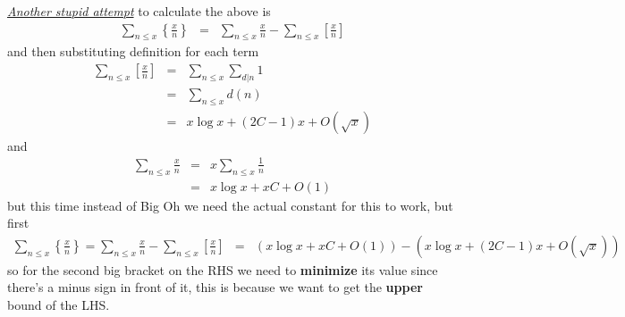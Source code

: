 \documentclass[aps,preprint,preprintnumbers,nofootinbib,showpacs,prd]{revtex4-1}
\newcommand{\nbea}{\begin{eqnarray*}}
\newcommand{\neea}{\end{eqnarray*}}
\begin{document}
\underline{\textit{Another stupid attempt}} to calculate the above is
%
\nbea
\sum_{n\le x}\left\{\frac{x}{n}\right\} & = & \sum_{n\le x}\frac{x}{n} - \sum_{n\le x}\left\lbrack\frac{x}{n}\right\rbrack 
\neea
%
and then substituting definition for each term
%
\nbea
\sum_{n\le x}\left\lbrack\frac{x}{n}\right\rbrack & = & \sum_{n\le x} \sum_{d|n} 1 \\
& = & \sum_{n\le x} d(n) \\
& = & x\log x + (2C-1)x + O(\sqrt{x})
\neea
%
and
%
\nbea
\sum_{n\le x}\frac{x}{n} & = & x\sum_{n\le x}\frac{1}{n} \\
& = & x\log x + xC + O\left(1\right)
\neea
%
but this time instead of Big Oh we need the actual constant for this to work, but first
%
\nbea
\sum_{n\le x}\left\{\frac{x}{n}\right\} = \sum_{n\le x}\frac{x}{n} - \sum_{n\le x}\left\lbrack\frac{x}{n}\right\rbrack & = & \left(x\log x + xC + O\left(1\right)\right) - \left(x\log x + (2C-1)x + O(\sqrt{x})\right)
\neea
%
so for the second big bracket on the RHS we need to {\bf minimize} its value since there's a minus sign in front of it, this is because we want to get the {\bf upper} bound of the LHS.
\end{document}

